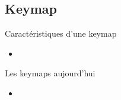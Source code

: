 \subsection{Keymap}

\begin{frame}{Caractéristiques d’une keymap}
  \begin{itemize}
    \item
  \end{itemize}
\end{frame}

\begin{frame}{Les keymaps aujourd’hui}
  \begin{itemize}
    \item
  \end{itemize}
\end{frame}
